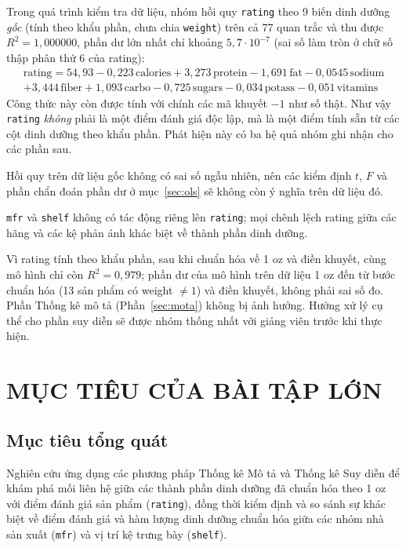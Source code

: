 \documentclass[12pt,a4paper]{article}
\begin{document}
Trong quá trình kiểm tra dữ liệu, nhóm hồi quy \texttt{rating} theo 9 biến dinh dưỡng
\emph{gốc} (tính theo khẩu phần, chưa chia \texttt{weight}) trên cả 77 quan trắc và thu
được $R^2 = 1{,}000000$, phần dư lớn nhất chỉ khoảng $5{,}7\cdot10^{-7}$ (sai số làm tròn
ở chữ số thập phân thứ 6 của rating):
\begin{multline}
\text{rating} = 54{,}93 - 0{,}223\,\text{calories} + 3{,}273\,\text{protein}
  - 1{,}691\,\text{fat} - 0{,}0545\,\text{sodium} \\
  + 3{,}444\,\text{fiber} + 1{,}093\,\text{carbo} - 0{,}725\,\text{sugars}
  - 0{,}034\,\text{potass} - 0{,}051\,\text{vitamins}
\end{multline}
Công thức này còn được tính với chính các mã khuyết $-1$ như số thật. Như vậy
\texttt{rating} \emph{không} phải là một điểm đánh giá độc lập, mà là một điểm tính sẵn từ
các cột dinh dưỡng theo khẩu phần. Phát hiện này có ba hệ quả nhóm ghi nhận cho các phần sau.

Hồi quy trên dữ liệu gốc không có sai số ngẫu nhiên, nên các kiểm định $t$, $F$ và
phần chẩn đoán phần dư ở mục~\ref{sec:ols} sẽ không còn ý nghĩa trên dữ liệu đó.

\texttt{mfr} và \texttt{shelf} không có tác động riêng lên \texttt{rating}; mọi chênh
lệch rating giữa các hãng và các kệ phản ánh khác biệt về thành phần dinh dưỡng.

Vì rating tính theo khẩu phần, sau khi chuẩn hóa về 1 oz và điền khuyết, cùng mô hình
chỉ còn $R^2 = 0{,}979$; phần dư của mô hình trên dữ liệu 1 oz đến từ bước chuẩn hóa (13 sản
phẩm có weight $\neq 1$) và điền khuyết, không phải sai số đo.
Phần Thống kê mô tả (Phần~\ref{sec:mota}) không bị ảnh hưởng. Hướng xử lý cụ thể cho phần
suy diễn sẽ được nhóm thống nhất với giảng viên trước khi thực hiện.

\section{MỤC TIÊU CỦA BÀI TẬP LỚN}

\subsection{Mục tiêu tổng quát}

Nghiên cứu ứng dụng các phương pháp Thống kê Mô tả và Thống kê Suy diễn để khám phá mối liên
hệ giữa các thành phần dinh dưỡng đã chuẩn hóa theo 1 oz với điểm đánh giá sản phẩm
(\texttt{rating}), đồng thời kiểm định và so sánh sự khác biệt về điểm đánh giá và hàm lượng
dinh dưỡng chuẩn hóa giữa các nhóm nhà sản xuất (\texttt{mfr}) và vị trí kệ trưng bày
(\texttt{shelf}).
\end{document}
